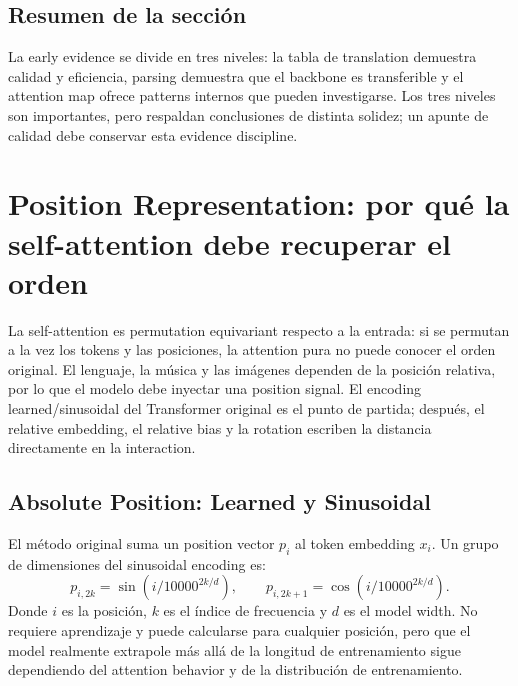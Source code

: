 \documentclass[a4paper]{article}
\begin{document}

\subsection{Resumen de la sección}

La early evidence se divide en tres niveles: la tabla de translation demuestra calidad y eficiencia, parsing demuestra que el backbone es transferible y el attention map ofrece patterns internos que pueden investigarse. Los tres niveles son importantes, pero respaldan conclusiones de distinta solidez; un apunte de calidad debe conservar esta evidence discipline.
\section{Position Representation: por qué la self-attention debe recuperar el orden}

La self-attention es permutation equivariant respecto a la entrada: si se permutan a la vez los tokens y las posiciones, la attention pura no puede conocer el orden original. El lenguaje, la música y las imágenes dependen de la posición relativa, por lo que el modelo debe inyectar una position signal. El encoding learned/sinusoidal del Transformer original es el punto de partida; después, el relative embedding, el relative bias y la rotation escriben la distancia directamente en la interaction.

\subsection{Absolute Position: Learned y Sinusoidal}

El método original suma un position vector $p_i$ al token embedding $x_i$. Un grupo de dimensiones del sinusoidal encoding es:
\[
p_{i,2k}=\sin\!\left(i/10000^{2k/d}\right),\qquad
p_{i,2k+1}=\cos\!\left(i/10000^{2k/d}\right).
\]
Donde $i$ es la posición, $k$ es el índice de frecuencia y $d$ es el model width. No requiere aprendizaje y puede calcularse para cualquier posición, pero que el model realmente extrapole más allá de la longitud de entrenamiento sigue dependiendo del attention behavior y de la distribución de entrenamiento.
\end{document}
